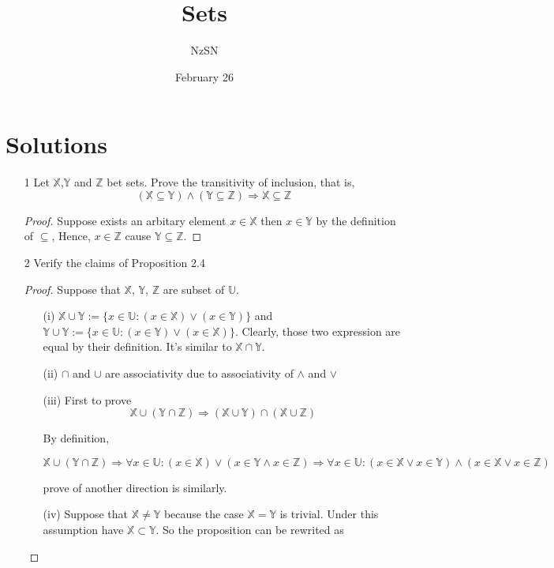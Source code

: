 \documentclass[11pt]{book}
\title{Sets}
\author{NzSN}
\date{February 26}
\newcommand{\bb}[1]{\mathbb{#1}}
\newcommand{\Ra}{\Rightarrow}
\begin{document}
\maketitle

\vspace{0.2 cm}
\section{Solutions}

\begin{enumerate}
\item[1]
        Let $\bb{X}$,$\bb{Y}$ and $\bb{Z}$ bet sets.
        Prove the transitivity of inclusion, that is,
        $$(\bb{X} \subseteq \bb{Y}) \land (\bb{Y} \subseteq \bb{Z}) \Ra \bb{X} \subseteq \bb{Z}$$
\begin{proof}
  Suppose exists an arbitary element $x \in \bb{X}$ then $x \in \bb{Y}$ by the definition of $\subseteq$,
  Hence, $x \in \bb{Z}$ cause $\bb{Y} \subseteq \bb{Z}$.
\end{proof}

\item[2]
        Verify the claims of Proposition 2.4
\begin{proof}
Suppose that $\bb{X}$, $\bb{Y}$, $\bb{Z}$ are subset of $\bb{U}$.
\begin{enumerate}
  \item[(i)]
        $\bb{X} \cup \bb{Y} := \{ x \in \bb{U} : (x \in \bb{X}) \lor (x \in \bb{Y}) \}$ and
        $\bb{Y} \cup \bb{Y} := \{ x \in \bb{U} : (x \in \bb{Y}) \lor (x \in \bb{X}) \}$.
        Clearly, those two expression are equal by their definition. It's similar to $\bb{X} \cap \bb{Y}$.
  \item[(ii)]
        $\cap$ and $\cup$ are associativity due to associativity of $\land$ and $\lor$
  \item[(iii)]
        First to prove
        $$\bb{X} \cup (\bb{Y} \cap \bb{Z}) \Ra
        (\bb{X} \cup \bb{Y}) \cap (\bb{X} \cup \bb{Z})$$

        By definition,

        $$\bb{X} \cup (\bb{Y} \cap \bb{Z}) \Ra
        \forall x \in \bb{U}: (x \in \bb{X}) \lor (x \in \bb{Y} \land x \in \bb{Z})
        \Ra \forall x \in \bb{U}: (x \in \bb{X} \lor x \in \bb{Y}) \land (x \in \bb{X} \lor x \in \bb{Z})$$

        prove of another direction is similarly.
  \item[(iv)]
        Suppose that $\bb{X} \neq \bb{Y}$ because the case $\bb{X} = \bb{Y}$ is trivial. Under this assumption have $\bb{X} \subset \bb{Y}$. So the proposition can be rewrited as


\end{enumerate}
\end{proof}
\end{enumerate}
\end{document}
